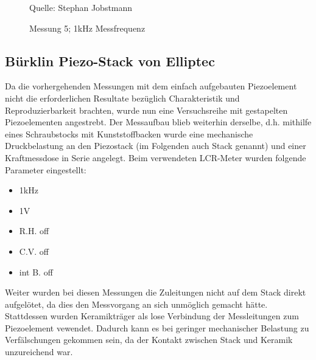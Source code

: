 \documentclass[12pt]{scrreprt} %
\begin{document}
\begin {figure}[htbp]
\caption{Messung 5; 1kHz Messfrequenz}
      \begin{center}
      \end{center}
Quelle: Stephan Jobstmann
\label{fig:2.4}
\end{figure}

\newpage
\subsection{Bürklin Piezo-Stack von Elliptec}
Da die vorhergehenden Messungen mit dem einfach aufgebauten Piezoelement nicht die erforderlichen Resultate bezüglich Charakteristik und Reproduzierbarkeit brachten, wurde nun eine Versuchsreihe mit gestapelten Piezoelementen angestrebt. Der Messaufbau blieb weiterhin derselbe, d.h. mithilfe eines Schraubstocks mit Kunststoffbacken wurde eine mechanische Druckbelastung an den Piezostack (im Folgenden auch Stack genannt) und einer Kraftmessdose in Serie angelegt. Beim verwendeten LCR-Meter wurden folgende Parameter eingestellt:
\begin{itemize}
\item 1kHz
\item 1V
\item R.H. off
\item C.V. off
\item int B. off
\end{itemize}
Weiter wurden bei diesen Messungen die Zuleitungen nicht auf dem Stack direkt aufgelötet, da dies den Messvorgang an sich unmöglich gemacht hätte. Stattdessen wurden Keramikträger als lose Verbindung der Messleitungen zum Piezoelement vewendet. Dadurch kann es bei geringer mechanischer Belastung zu Verfälschungen gekommen sein, da der Kontakt zwischen Stack und Keramik unzureichend war.
\end{document}
